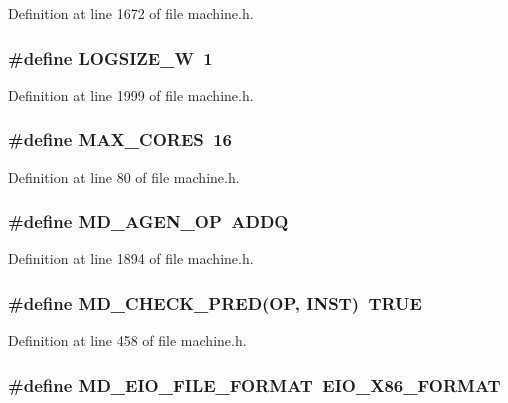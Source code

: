 Definition at line 1672 of file machine.h.
\subsubsection[{LOGSIZE\_\-W}]{\setlength{\rightskip}{0pt plus 5cm}\#define LOGSIZE\_\-W~1}\label{machine_8h_6a0692b4a671dd581211a555ffc14bad}




Definition at line 1999 of file machine.h.
\subsubsection[{MAX\_\-CORES}]{\setlength{\rightskip}{0pt plus 5cm}\#define MAX\_\-CORES~16}\label{machine_8h_009855593b59738d24dbfc236edb3b14}




Definition at line 80 of file machine.h.
\subsubsection[{MD\_\-AGEN\_\-OP}]{\setlength{\rightskip}{0pt plus 5cm}\#define MD\_\-AGEN\_\-OP~ADDQ}\label{machine_8h_dfa27dc9a8c76c1d0b2ffaaefc8eccdb}




Definition at line 1894 of file machine.h.
\subsubsection[{MD\_\-CHECK\_\-PRED}]{\setlength{\rightskip}{0pt plus 5cm}\#define MD\_\-CHECK\_\-PRED(OP, \/  INST)~TRUE}\label{machine_8h_2d5b1d03418f115258fdb1d043cdb5cc}




Definition at line 458 of file machine.h.
\subsubsection[{MD\_\-EIO\_\-FILE\_\-FORMAT}]{\setlength{\rightskip}{0pt plus 5cm}\#define MD\_\-EIO\_\-FILE\_\-FORMAT~EIO\_\-X86\_\-FORMAT}\label{machine_8h_582be4cbf2f4d1d37a8deeb4552136e3}




